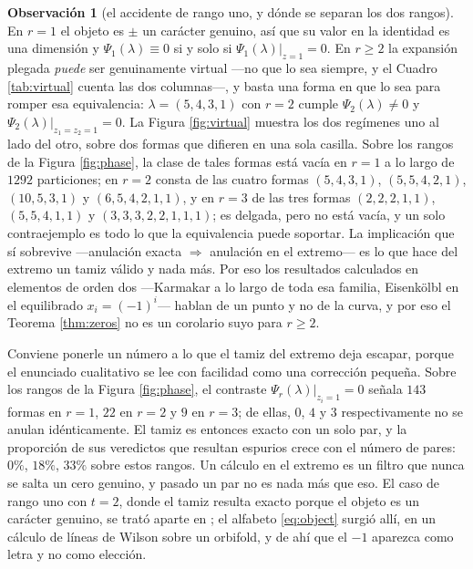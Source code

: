 \documentclass[11pt,reqno]{amsart}
\theoremstyle{plain}
\theoremstyle{definition}
\newtheorem{remark}[theorem]{Observación}
\begin{document}
\begin{remark}[el accidente de rango uno, y dónde se separan los dos rangos]\label{rem:rankone}
En $r=1$ el objeto es $\pm$ un carácter genuino, así que su valor en la identidad es una dimensión y
$\Psi_1(\lambda)\equiv0$ si y solo si $\Psi_1(\lambda)|_{z=1}=0$. En $r\ge2$ la expansión plegada
\emph{puede} ser genuinamente virtual ---no que lo sea siempre, y el Cuadro \ref{tab:virtual} cuenta
las dos columnas---, y basta una forma en que lo sea para romper esa equivalencia:
$\lambda=(5,4,3,1)$ con $r=2$ cumple
$\Psi_2(\lambda)\ne0$ y $\Psi_2(\lambda)|_{z_1=z_2=1}=0$. La Figura \ref{fig:virtual} muestra
los dos regímenes uno al lado del otro, sobre dos formas que difieren en una sola casilla. Sobre los rangos de la Figura
\ref{fig:phase}, la clase de tales formas está vacía en $r=1$ a lo largo de $1292$ particiones; en
$r=2$ consta de las cuatro formas $(5,4,3,1)$, $(5,5,4,2,1)$, $(10,5,3,1)$ y $(6,5,4,2,1,1)$, y en
$r=3$ de las tres formas $(2,2,2,1,1)$, $(5,5,4,1,1)$ y $(3,3,3,2,2,1,1,1)$; es delgada, pero no está
vacía, y un solo contraejemplo es todo lo que la equivalencia puede soportar. La implicación que sí
sobrevive ---anulación exacta $\Rightarrow$ anulación en el extremo--- es lo que hace del extremo un
tamiz válido y nada más. Por eso los resultados calculados en elementos de orden dos ---Karmakar
\cite{Kar24} a lo largo de toda esa familia, Eisenkölbl \cite{Eis07} en el equilibrado
$x_i=(-1)^i$--- hablan de un punto y no de la curva, y por eso el
Teorema \ref{thm:zeros} no es un corolario suyo para $r\ge2$.
\end{remark}

Conviene ponerle un número a lo que el tamiz del extremo deja escapar, porque el enunciado
cualitativo se lee con facilidad como una corrección pequeña. Sobre los rangos de la Figura
\ref{fig:phase}, el contraste $\Psi_r(\lambda)|_{z_i=1}=0$ señala $143$ formas en $r=1$, $22$ en $r=2$
y $9$ en $r=3$; de ellas, $0$, $4$ y $3$ respectivamente no se anulan idénticamente. El tamiz es
entonces exacto con un solo par, y la proporción de sus veredictos que resultan espurios crece con el
número de pares: $0\%$, $18\%$, $33\%$ sobre estos rangos. Un cálculo en el extremo es un filtro que
nunca se salta un cero genuino, y pasado un par no es nada más que eso. El caso de rango uno con
$t=2$, donde el tamiz resulta exacto porque el objeto es un carácter genuino, se trató aparte en
\cite{Mar26}; el alfabeto \eqref{eq:object} surgió allí, en un cálculo de líneas de Wilson sobre un
orbifold, y de ahí que el $-1$ aparezca como letra y no como elección.
\end{document}
